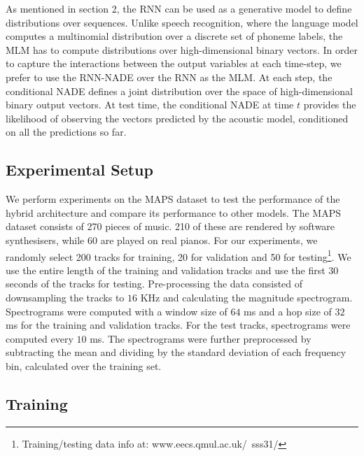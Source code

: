 \documentclass{article}
\begin{document}
As mentioned in section 2, the RNN can be used as a generative model to define distributions over sequences. Unlike speech recognition, where the language model computes a multinomial distribution over a discrete set of phoneme labels, the MLM has to compute distributions over high-dimensional binary vectors. In order to capture the interactions between the output variables at each time-step, we prefer to use the RNN-NADE over the RNN as the MLM. At each step, the conditional NADE defines a joint distribution over the space of high-dimensional binary output vectors. At test time, the conditional NADE at time $t$ provides the likelihood of observing the vectors predicted by the acoustic model, conditioned on all the predictions so far.  
\subsection{Experimental Setup}
We perform experiments on the MAPS dataset \cite{emiya2010multipitch} to test the performance of the hybrid architecture and compare its performance to other models. The MAPS dataset consists of 270 pieces of music. 210 of these are rendered by software synthesisers, while 60 are played on real pianos. For our experiments, we randomly select 200 tracks for training, 20 for validation and 50 for testing\footnote{Training/testing data info at: www.eecs.qmul.ac.uk/~sss31/}. We use the entire length of the training and validation tracks and use the first 30 seconds of the tracks for testing. Pre-processing the data consisted of downsampling the tracks to $16$ KHz and calculating the magnitude spectrogram. Spectrograms were computed with a window size of $64$ ms and a hop size of $32$ ms for the training and validation tracks. For the test tracks, spectrograms were computed every $10$ ms. The spectrograms were further preprocessed by subtracting the mean and dividing by the standard deviation of each frequency bin, calculated over the training set. 

\subsection{Training}
\end{document}
